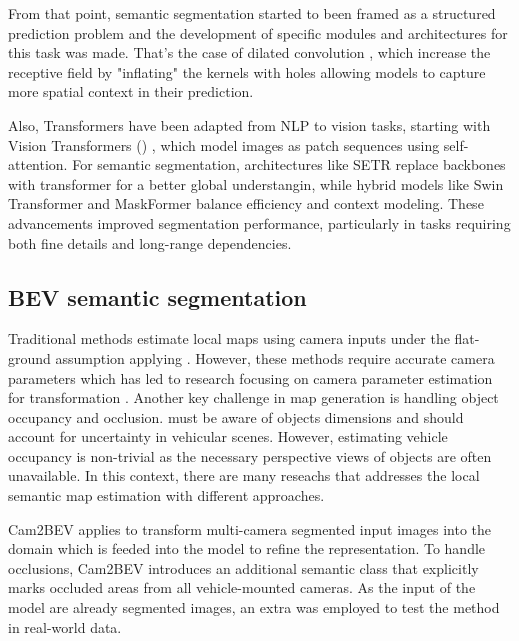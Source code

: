 From that point, semantic segmentation started to been framed as a structured prediction problem and the development of specific modules and architectures for this task was made. That's the case of dilated convolution \cite{ditaled_conv}, which increase the receptive field by "inflating" the  kernels with holes allowing models to capture more spatial context in their prediction.

Also, Transformers have been adapted from NLP to vision tasks, starting with Vision Transformers () \cite{vit}, which model images as patch sequences using self-attention. For semantic segmentation, architectures like SETR \cite{SETR} replace  backbones with transformer for a better global understangin, while hybrid models like Swin Transformer \cite{swin} and MaskFormer balance efficiency and context modeling. These advancements improved segmentation performance, particularly in tasks requiring both fine details and long-range dependencies.

\subsection{BEV semantic segmentation} 
\label{sec:sota_BEV_semantic_segmentation}

Traditional methods \cite{3d_traffic_scene_understanding} estimate local  maps using camera inputs under the flat-ground assumption applying . However, these methods require accurate camera parameters which has led to research focusing on camera parameter estimation for  transformation \cite{BEV_params_estimation1} \cite{BEV_params_estimation2}. Another key challenge in  map generation is handling object occupancy and occlusion.  must be aware of objects dimensions and should account for uncertainty in vehicular scenes. However, estimating vehicle occupancy is non-trivial as the necessary perspective views of objects are often unavailable. In this context, there are many reseachs that addresses the local semantic map estimation with different approaches.

Cam2BEV \cite{Cam2BEV} applies  to transform multi-camera segmented input images into the  domain which is feeded into the model to refine the  representation. To handle occlusions, Cam2BEV introduces an additional semantic class that explicitly marks occluded areas from all vehicle-mounted cameras. As the input of the model are already segmented images, an extra  was employed to test the method in real-world data.  

